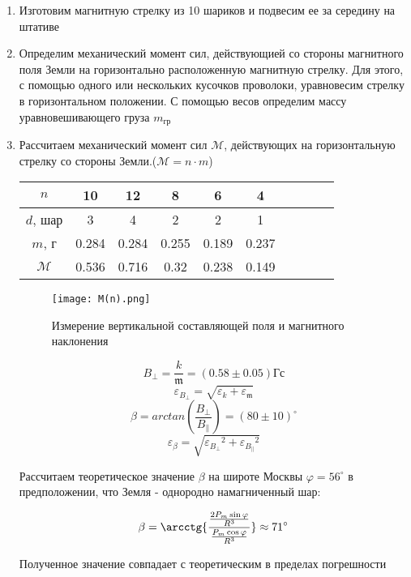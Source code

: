 \documentclass[12pt,a4paper]{article}
\begin{document}
\begin{enumerate}
    \item Изготовим магнитную стрелку из 10 шариков и подвесим ее за середину на штативе
    \item Определим механический момент сил, действующией со стороны магнитного поля Земли на горизонтально расположенную магнитную стрелку. 
    Для этого, с помощью одного или нескольких кусочков проволоки, уравновесим стрелку в горизонтальном положении.
    С помощью весов определим массу уравновешивающего груза $m_{гр}$
    \item Рассчитаем механический момент сил $\mathcal{M}$, действующих на горизонтальную стрелку со стороны Земли.($\mathcal{M} = n\cdot m$)
    \\
    \begin{tabular}{|c|c|c|c|c|c|c|c|c|c|} \hline
        $n$    & 10   & 12   & 8    & 6    & 4    \\ \hline
        $d$, шар & 3    & 4    & 2    & 2    & 1    \\ \hline
        $m$, г   & 0.284 & 0.284 & 0.255 & 0.189 & 0.237 \\ \hline
        $\mathcal{M}$    & 0.536 & 0.716 & 0.32  & 0.238 & 0.149 \\ \hline
    \end{tabular}

    \begin{figure}[h!]
        \begin{center}
            \texttt{[image: M(n).png]}
            \caption{Измерение вертикальной составляющей поля и магнитного наклонения}
            \label{fig:facility}
        \end{center}
    \end{figure}
    \begin{equation}
        B_{\perp} = \frac{k}{\mathfrak{m}} = (0.58 \pm 0.05) \text{Гс}
    \end{equation}
    \begin{equation}
        \varepsilon_{B_{\perp}} = \sqrt{\varepsilon_{k} + \varepsilon_{\mathfrak{m}}}
    \end{equation}
    \begin{equation}
        \beta = arctan \left(\frac{B_{\perp}}{B_{\parallel}}\right) = (80 \pm 10)^{\circ}
    \end{equation}
    \begin{equation} 
        \varepsilon_{\beta} = \sqrt{{\varepsilon_{B_{\perp}}}^2 + {\varepsilon_{B_{\parallel}}}^2}
    \end{equation}

    Рассчитаем теоретическое значение $\beta$ на широте Москвы $\varphi = 56^{\circ}$ в предположении, что Земля - однородно намагниченный шар:
	
	\[\beta = \arcctg{\frac{\frac{2P_m \sin{\varphi}}{R^3}}{\frac{P_m \cos{\varphi}}{R^3}}} \approx 71^{\circ}\]
	
    Полученное значение совпадает с теоретическим в пределах погрешности
\end{enumerate}
\end{document}
